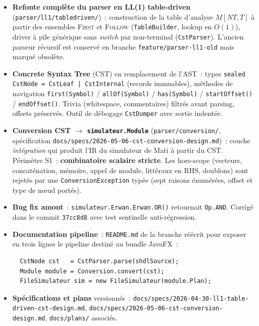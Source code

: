 \documentclass[11pt,a4paper]{article}
\begin{document}
\begin{itemize}
  \item \textbf{Refonte compl\`ete du parser en LL(1) table-driven} (\texttt{parser/ll1/tabledriven/})~: construction de la table d'analyse $M[NT, T]$ \`a partir des ensembles \textsc{First} et \textsc{Follow} (\texttt{TableBuilder}, lookup en $O(1)$), driver \`a pile g\'en\'erique sans \emph{switch} par non-terminal (\texttt{CstParser}). L'ancien parseur r\'ecursif est conserv\'e en branche \texttt{feature/parser-ll1-old} mais marqu\'e obsol\`ete.
  \item \textbf{Concrete Syntax Tree} (CST) en remplacement de l'AST~: types \texttt{sealed} \texttt{CstNode = CstLeaf | CstInternal} (records immuables), m\'ethodes de navigation \texttt{first(Symbol)} / \texttt{allOf(Symbol)} / \texttt{has(Symbol)} / \texttt{startOffset()} / \texttt{endOffset()}. Trivia (whitespace, commentaires) filtr\'es avant parsing, offsets pr\'eserv\'es. Outil de d\'ebogage \texttt{CstDumper} avec sortie indent\'ee.
  \item \textbf{Conversion CST $\to$ \texttt{simulateur.Module}} (\texttt{parser/conversion/}, sp\'ecification \texttt{docs/specs/2026-05-06-cst-conversion-design.md})~: couche \emph{int\'egration} qui produit l'IR du simulateur de Mati \`a partir du CST. P\'erim\`etre S1~: \textbf{combinatoire scalaire stricte}. Les hors-scope (vecteurs, concat\'enation, m\'emoire, appel de module, litt\'eraux en RHS, doublons) sont rejet\'es par une \texttt{ConversionException} typ\'ee (sept raisons \'enum\'er\'ees, offset et type de n\oe ud port\'es).
  \item \textbf{Bug fix amont}~: \texttt{simulateur.Erwan.Erwan.OR()} retournait \texttt{Op.AND}. Corrig\'e dans le commit \texttt{37cc8d8} avec test sentinelle anti-r\'egression.
  \item \textbf{Documentation pipeline}~: \texttt{README.md} de la branche r\'e\'ecrit pour exposer en trois lignes le pipeline destin\'e au bundle JavaFX~:
\begin{verbatim}
  CstNode cst   = CstParser.parse(shdlSource);
  Module module = Conversion.convert(cst);
  FileSimulateur sim = new FileSimulateur(module.Plan);
\end{verbatim}
  \item \textbf{Sp\'ecifications et plans} versionn\'es~: \texttt{docs/specs/2026-04-30-ll1-table-driven-cst-design.md}, \texttt{docs/specs/2026-05-06-cst-conversion-design.md}, \texttt{docs/plans/} associ\'es.
\end{itemize}
\end{document}
